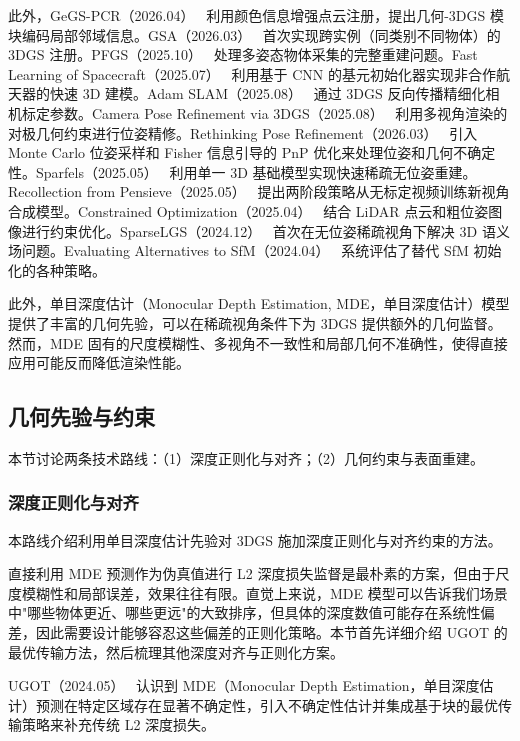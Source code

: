 此外，GeGS-PCR（2026.04）~\cite{2604_17721} 利用颜色信息增强点云注册，提出几何-3DGS 模块编码局部邻域信息。GSA（2026.03）~\cite{2603_21936} 首次实现跨实例（同类别不同物体）的 3DGS 注册。PFGS（2025.10）~\cite{2510_15386} 处理多姿态物体采集的完整重建问题。Fast Learning of Spacecraft（2025.07）~\cite{2507_19459} 利用基于 CNN 的基元初始化器实现非合作航天器的快速 3D 建模。Adam SLAM（2025.08）~\cite{2508_20526} 通过 3DGS 反向传播精细化相机标定参数。Camera Pose Refinement via 3DGS（2025.08）~\cite{2508_17876} 利用多视角渲染的对极几何约束进行位姿精修。Rethinking Pose Refinement（2026.03）~\cite{2603_16538} 引入 Monte Carlo 位姿采样和 Fisher 信息引导的 PnP 优化来处理位姿和几何不确定性。Sparfels（2025.05）~\cite{2505_02178} 利用单一 3D 基础模型实现快速稀疏无位姿重建。Recollection from Pensieve（2025.05）~\cite{2505_13440} 提出两阶段策略从无标定视频训练新视角合成模型。Constrained Optimization（2025.04）~\cite{2504_09129} 结合 LiDAR 点云和粗位姿图像进行约束优化。SparseLGS（2024.12）~\cite{2412_02245} 首次在无位姿稀疏视角下解决 3D 语义场问题。Evaluating Alternatives to SfM（2024.04）~\cite{2404_12547} 系统评估了替代 SfM 初始化的各种策略。

此外，单目深度估计（Monocular Depth Estimation, MDE，单目深度估计）模型提供了丰富的几何先验，可以在稀疏视角条件下为 3DGS 提供额外的几何监督。然而，MDE 固有的尺度模糊性、多视角不一致性和局部几何不准确性，使得直接应用可能反而降低渲染性能。

\subsection{几何先验与约束}
\label{ss:12_4}

本节讨论两条技术路线：（1）深度正则化与对齐；（2）几何约束与表面重建。

\subsubsection{深度正则化与对齐}

本路线介绍利用单目深度估计先验对 3DGS 施加深度正则化与对齐约束的方法。

直接利用 MDE 预测作为伪真值进行 L2 深度损失监督是最朴素的方案，但由于尺度模糊性和局部误差，效果往往有限。直觉上来说，MDE 模型可以告诉我们场景中"哪些物体更近、哪些更远"的大致排序，但具体的深度数值可能存在系统性偏差，因此需要设计能够容忍这些偏差的正则化策略。本节首先详细介绍 UGOT 的最优传输方法，然后梳理其他深度对齐与正则化方案。

UGOT（2024.05）~\cite{2405_19657} 认识到 MDE（Monocular Depth Estimation，单目深度估计）预测在特定区域存在显著不确定性，引入不确定性估计并集成基于块的最优传输策略来补充传统 L2 深度损失。

